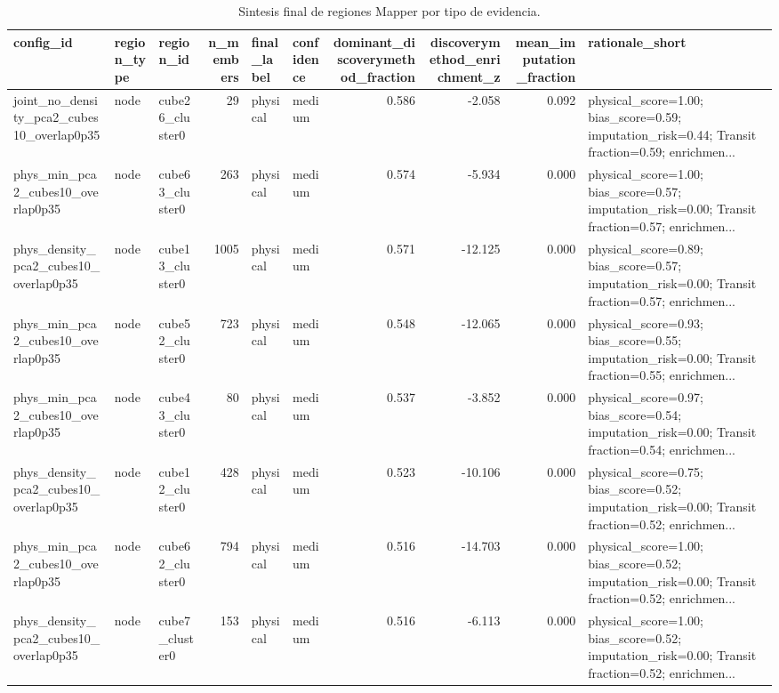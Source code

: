 \begin{table}[H]
\centering
\scriptsize
\caption{Sintesis final de regiones Mapper por tipo de evidencia.}
\label{tab:final_region_synthesis}
\begin{adjustbox}{max width=\linewidth}
\begin{tabular}{lllrllrrrl}
\toprule
config\_id & region\_type & region\_id & n\_members & final\_label & confidence & dominant\_discoverymethod\_fraction & discoverymethod\_enrichment\_z & mean\_imputation\_fraction & rationale\_short \\
\midrule
joint\_no\_density\_pca2\_cubes10\_overlap0p35 & node & cube26\_cluster0 & 29 & physical & medium & 0.586 & -2.058 & 0.092 & physical\_score=1.00; bias\_score=0.59; imputation\_risk=0.44; Transit fraction=0.59; enrichmen... \\
phys\_min\_pca2\_cubes10\_overlap0p35 & node & cube63\_cluster0 & 263 & physical & medium & 0.574 & -5.934 & 0.000 & physical\_score=1.00; bias\_score=0.57; imputation\_risk=0.00; Transit fraction=0.57; enrichmen... \\
phys\_density\_pca2\_cubes10\_overlap0p35 & node & cube13\_cluster0 & 1005 & physical & medium & 0.571 & -12.125 & 0.000 & physical\_score=0.89; bias\_score=0.57; imputation\_risk=0.00; Transit fraction=0.57; enrichmen... \\
phys\_min\_pca2\_cubes10\_overlap0p35 & node & cube52\_cluster0 & 723 & physical & medium & 0.548 & -12.065 & 0.000 & physical\_score=0.93; bias\_score=0.55; imputation\_risk=0.00; Transit fraction=0.55; enrichmen... \\
phys\_min\_pca2\_cubes10\_overlap0p35 & node & cube43\_cluster0 & 80 & physical & medium & 0.537 & -3.852 & 0.000 & physical\_score=0.97; bias\_score=0.54; imputation\_risk=0.00; Transit fraction=0.54; enrichmen... \\
phys\_density\_pca2\_cubes10\_overlap0p35 & node & cube12\_cluster0 & 428 & physical & medium & 0.523 & -10.106 & 0.000 & physical\_score=0.75; bias\_score=0.52; imputation\_risk=0.00; Transit fraction=0.52; enrichmen... \\
phys\_min\_pca2\_cubes10\_overlap0p35 & node & cube62\_cluster0 & 794 & physical & medium & 0.516 & -14.703 & 0.000 & physical\_score=1.00; bias\_score=0.52; imputation\_risk=0.00; Transit fraction=0.52; enrichmen... \\
phys\_density\_pca2\_cubes10\_overlap0p35 & node & cube7\_cluster0 & 153 & physical & medium & 0.516 & -6.113 & 0.000 & physical\_score=1.00; bias\_score=0.52; imputation\_risk=0.00; Transit fraction=0.52; enrichmen... \\

\end{tabular}
\end{adjustbox}
\end{table}
